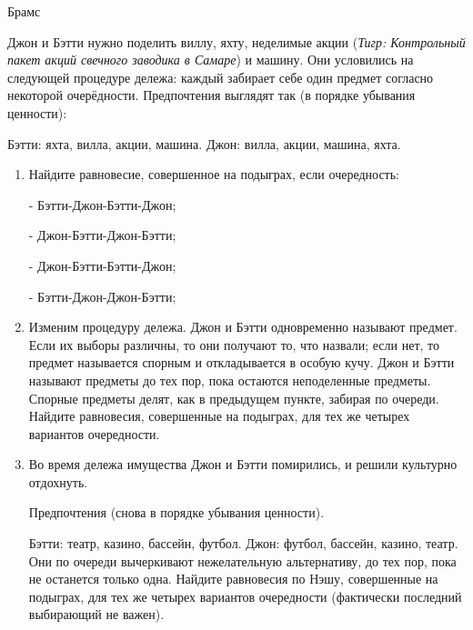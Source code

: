 \begin{problem}[Развод]\par
\begin{source}
Брамс
\end{source}
Джон и Бэтти нужно поделить виллу, яхту, неделимые акции ({\it Тигр: Контрольный пакет акций свечного заводика в Самаре}) и машину. Они условились на следующей процедуре дележа: каждый забирает себе один предмет согласно некоторой очерёдности.
Предпочтения выглядят так (в порядке убывания ценности):\par
Бэтти: яхта, вилла, акции, машина. Джон: вилла, акции, машина, яхта.
\begin{enumerate}
\item     Найдите равновесие, совершенное на подыграх, если очередность:\par
- Бэтти-Джон-Бэтти-Джон;\par
- Джон-Бэтти-Джон-Бэтти;\par
- Джон-Бэтти-Бэтти-Джон;\par
- Бэтти-Джон-Джон-Бэтти;\par
\item Изменим процедуру дележа. Джон и Бэтти одновременно называют предмет. Если их выборы различны, то они получают то, что назвали; если нет, то предмет называется спорным и откладывается в особую кучу. Джон и Бэтти называют предметы до тех пор, пока остаются неподеленные предметы. Спорные предметы делят, как в предыдущем пункте, забирая по очереди. Найдите равновесия, совершенные на подыграх, для тех же четырех вариантов очередности.\par
\item Во время дележа имущества Джон и Бэтти помирились, и решили культурно отдохнуть.\par
Предпочтения (снова в порядке убывания ценности).\par
Бэтти: театр, казино, бассейн, футбол. Джон: футбол, бассейн, казино, театр.
Они по очереди вычеркивают нежелательную альтернативу, до тех пор, пока не останется только одна. Найдите равновесия по Нэшу, совершенные на подыграх, для тех же четырех вариантов очередности (фактически последний выбирающий не важен).
\end{enumerate}
\par



\begin{sol}

\end{sol}
\end{problem}



